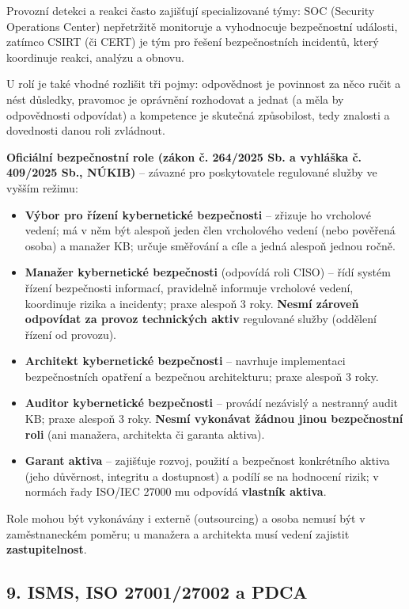 Provozní detekci a reakci často zajišťují specializované týmy: SOC (Security Operations Center) nepřetržitě monitoruje a vyhodnocuje bezpečnostní události, zatímco CSIRT (či CERT) je tým pro řešení bezpečnostních incidentů, který koordinuje reakci, analýzu a obnovu.

U rolí je také vhodné rozlišit tři pojmy: odpovědnost je povinnost za něco ručit a nést důsledky, pravomoc je oprávnění rozhodovat a jednat (a měla by odpovědnosti odpovídat) a kompetence je skutečná způsobilost, tedy znalosti a dovednosti danou roli zvládnout.

\begin{notebox}
\textbf{Oficiální bezpečnostní role (zákon č. 264/2025 Sb. a vyhláška č. 409/2025 Sb., NÚKIB)} -- závazné pro poskytovatele regulované služby ve vyšším režimu:
\begin{itemize}
  \item \textbf{Výbor pro řízení kybernetické bezpečnosti} -- zřizuje ho vrcholové vedení; má v něm být alespoň jeden člen vrcholového vedení (nebo pověřená osoba) a manažer KB; určuje směřování a cíle a jedná alespoň jednou ročně.
  \item \textbf{Manažer kybernetické bezpečnosti} (odpovídá roli CISO) -- řídí systém řízení bezpečnosti informací, pravidelně informuje vrcholové vedení, koordinuje rizika a incidenty; praxe alespoň 3 roky. \textbf{Nesmí zároveň odpovídat za provoz technických aktiv} regulované služby (oddělení řízení od provozu).
  \item \textbf{Architekt kybernetické bezpečnosti} -- navrhuje implementaci bezpečnostních opatření a bezpečnou architekturu; praxe alespoň 3 roky.
  \item \textbf{Auditor kybernetické bezpečnosti} -- provádí nezávislý a nestranný audit KB; praxe alespoň 3 roky. \textbf{Nesmí vykonávat žádnou jinou bezpečnostní roli} (ani manažera, architekta či garanta aktiva).
  \item \textbf{Garant aktiva} -- zajišťuje rozvoj, použití a bezpečnost konkrétního aktiva (jeho důvěrnost, integritu a dostupnost) a podílí se na hodnocení rizik; v normách řady ISO/IEC 27000 mu odpovídá \textbf{vlastník aktiva}.
\end{itemize}
Role mohou být vykonávány i externě (outsourcing) a osoba nemusí být v zaměstnaneckém poměru; u manažera a architekta musí vedení zajistit \textbf{zastupitelnost}.
\end{notebox}

\subsection*{9. ISMS, ISO 27001/27002 a PDCA}

